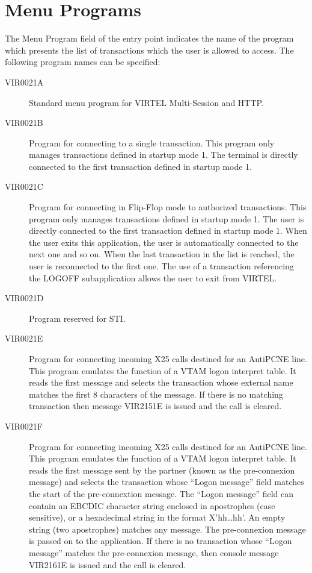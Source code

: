 \documentclass[letterpaper,10pt,english]{sphinxmanual}
\begin{document}
\section{Menu Programs}
\label{\detokenize{connectivity_guide:menu-programs}}
The Menu Program field of the entry point indicates the name of the program which presents the list of transactions which the user is allowed to access. The following program names can be specified:
\begin{description}
\item[{VIR0021A}] \leavevmode
Standard menu program for VIRTEL Multi-Session and HTTP.

\item[{VIR0021B}] \leavevmode
Program for connecting to a single transaction. This program only manages transactions defined in startup mode 1. The terminal is directly connected to the first transaction defined in startup mode 1.

\item[{VIR0021C}] \leavevmode
Program for connecting in Flip-Flop mode to authorized transactions. This program only manages transactions defined in startup mode 1. The user is directly connected to the first transaction defined in startup mode 1. When the user exits this application, the user is automatically connected to the next one and so on. When the last transaction in the list is reached, the user is reconnected to the first one. The use of a transaction referencing the LOGOFF subapplication allows the user to exit from VIRTEL.

\item[{VIR0021D}] \leavevmode
Program reserved for STI.

\item[{VIR0021E}] \leavevmode
Program for connecting incoming X25 calls destined for an AntiPCNE line. This program emulates the function of a VTAM logon interpret table. It reads the first message and selects the transaction whose external name matches the first 8 characters of the message. If there is no matching transaction then message VIR2151E is issued and the call is cleared.

\item[{VIR0021F}] \leavevmode
Program for connecting incoming X25 calls destined for an AntiPCNE line. This program emulates the function of a VTAM logon interpret table. It reads the first message sent by the partner (known as the pre-connexion message) and selects the transaction whose “Logon message” field matches the start of the pre-connextion message. The “Logon message” field can contain an EBCDIC character string enclosed in apostrophes (case sensitive), or a hexadecimal string in the format X’hh…hh’. An empty string (two apostrophes) matches any message. The pre-connexion message is passed on to the application. If there is no transaction whose “Logon message” matches the pre-connexion message, then console message VIR2161E is issued and the call is cleared.


\end{description}
\end{document}
